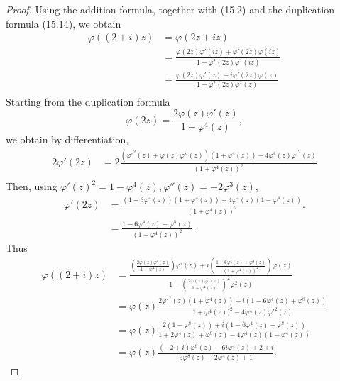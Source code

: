 \documentclass[11pt,a4paper]{article}
\begin{document}
\begin{proof} 
Using the addition formula, together with (15.2) and the duplication formula (15.14), we obtain
\begin{align*}
\varphi\left((2+i)z\right)&= \varphi(2z + iz)\\
&=\frac{\varphi(2z)\varphi'(iz) + \varphi'(2z)\varphi(iz)}{1+ \varphi^2(2z) \varphi^2(iz)}\\
&=\frac{\varphi(2z)\varphi'(z) +i \varphi'(2z)\varphi(z)}{1- \varphi^2(2z) \varphi^2(z)}\\
\end{align*}
Starting from the duplication formula
$$\varphi(2z) = \frac{2 \varphi(z) \varphi'(z)}{1+ \varphi^4(z)},$$
we obtain by differentiation,
\begin{align*}
2 \varphi'(2z) &= 2 \frac{\left(\varphi'^2(z) + \varphi(z) \varphi''(z)\right)\left(1+ \varphi^4(z)\right)- 4 \varphi^4(z)\varphi'^2(z)}{(1+ \varphi^4(z))^2}\\
\end{align*}
Then, using $\varphi'(z)^2 = 1 - \varphi^4(z), \varphi''(z) = -2 \varphi^3(z)$,
\begin{align*}
\varphi'(2z) &=\frac{(1 -3 \varphi^4(z))(1+ \varphi^4(z))- 4 \varphi^4(z)(1 - \varphi^4(z))}{(1+ \varphi^4(z))^2}.\\
&= \frac{1 -6\varphi^4(z) + \varphi^8(z)}{\left(1+\varphi^4(z)\right)^2}.
\end{align*}
Thus
\begin{align*}
\varphi\left((2+i)z\right)&=\frac{ \left(\frac{2 \varphi(z) \varphi'(z)}{1+ \varphi^4(z)}\right)\varphi'(z) +i  \left(\frac{1 -6\varphi^4(z) + \varphi^8(z)}{\left(1+\varphi^4(z)\right)^2}\right)\varphi(z)}{1-  \left(\frac{2 \varphi(z) \varphi'(z)}{1+ \varphi^4(z)}\right)^2 \varphi^2(z)}\\
&= \varphi(z)\frac{2 \varphi'^2(z)(1+ \varphi^4(z)) + i (1-6\varphi^4(z) + \varphi^8(z))}{1+ \varphi^4(z))^2 - 4 \varphi^4(z) \varphi'^2(z)}\\
&=\varphi(z) \frac{2(1-\varphi^8(z)) + i (1-6\varphi^4(z) + \varphi^8(z))}{1 + 2 \varphi^4(z) + \varphi^8(z) - 4 \varphi^4(z)(1 - \varphi^4(z))}\\
&=\varphi(z) \frac{(-2+i) \varphi^8(z) - 6i \varphi^4(z) + 2+i}{5 \varphi^8(z) - 2 \varphi^4(z) + 1}.
\end{align*}


\end{proof}
\end{document}
